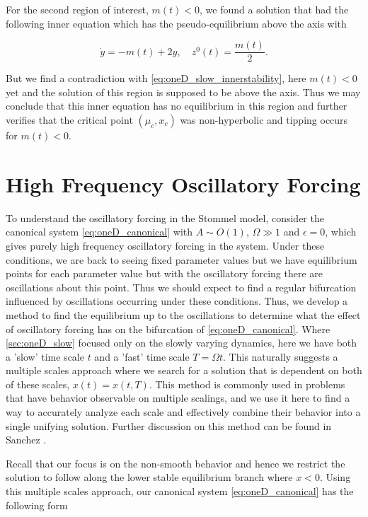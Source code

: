 For the second region of interest, $m(t)<0$, we found a solution that had the following inner equation which has the pseudo-equilibrium above the axis with

\begin{equation}\label{eq:oneD_slow_innerstability}
\dot{y}=-m(t)+2y, \quad z^0(t) = \frac{m(t)}{2}.
\end{equation}

But we find a contradiction with \eqref{eq:oneD_slow_innerstability}, here $m(t)<0$ yet and the solution of this region is supposed to be above the axis. Thus we may conclude that this inner equation has no equilibrium in this region and further verifies that the critical point $(\mu_c,x_c)$ was non-hyperbolic and tipping occurs for $m(t)<0$.

\section{High Frequency Oscillatory Forcing}
\label{sec:oneD_highfreqosc}

To understand the oscillatory forcing in the Stommel model, consider the canonical system \eqref{eq:oneD_canonical} with $A\sim O(1)$, $\Omega\gg 1$ and $\epsilon=0$, which gives purely high frequency oscillatory forcing in the system. Under these conditions, we are back to seeing fixed parameter values but we have equilibrium points for each parameter value but with the oscillatory forcing there are oscillations about this point. Thus we should expect to find a regular bifurcation influenced by oscillations occurring under these conditions. Thus, we develop a method to find the equilibrium up to the oscillations to determine what the effect of oscillatory forcing has on the bifurcation of \eqref{eq:oneD_canonical}. Where \autoref{sec:oneD_slow} focused only on the slowly varying dynamics, here we have both a 'slow' time scale $t$ and a 'fast' time scale $T=\Omega t$. This naturally suggests a multiple scales approach where we search for a solution that is dependent on both of these scales, $x(t)=x(t,T)$. This method is commonly used in problems that have behavior observable on multiple scalings, and we use it here to find a way to accurately analyze each scale and effectively combine their behavior into a single unifying solution. Further discussion on this method can be found in Sanchez \cite{sanchez1996method}.

Recall that our focus is on the non-smooth behavior and hence we restrict the solution to follow along the lower stable equilibrium branch where $x<0$. Using this multiple scales approach, our canonical system \eqref{eq:oneD_canonical} has the following form

